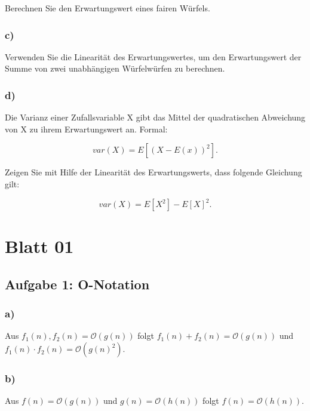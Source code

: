 \documentclass[paper=a4, fontsize=11pt]{scrartcl}
\numberwithin{equation}{section}
\numberwithin{figure}{section}
\numberwithin{table}{section}
\begin{document}
Berechnen Sie den Erwartungswert eines fairen Würfels.

\subsubsection*{c)}

Verwenden Sie die Linearität des Erwartungswertes, um den Erwartungswert der Summe von zwei unabhängigen Würfelwürfen zu berechnen.

\subsubsection*{d)}

Die Varianz einer Zufallsvariable X gibt das Mittel der quadratischen Abweichung von X zu ihrem Erwartungswert an. Formal:

$$var(X) = E[(X-E(x))^{2}].$$

Zeigen Sie mit Hilfe der Linearität des Erwartungswerts, dass folgende Gleichung gilt:

$$var(X) = E[X^{2}] - E[X]^{2}.$$


\newpage

\section{Blatt 01}


\subsection*{Aufgabe 1: O-Notation}

\subsubsection*{a)}

Aus $f_{1}(n), f_{2}(n) = \mathcal{O}(g(n))$ folgt $f_{1}(n) + f_{2}(n) = \mathcal{O}(g(n))$ und $f_{1}(n) \cdot f_{2}(n) = \mathcal{O}(g(n)^{2})$. \\

\subsubsection*{b)}

Aus $f(n) = \mathcal{O}(g(n))$ und $g(n) = \mathcal{O}(h(n))$ folgt $f(n) = \mathcal{O}(h(n))$. \\
\end{document}

